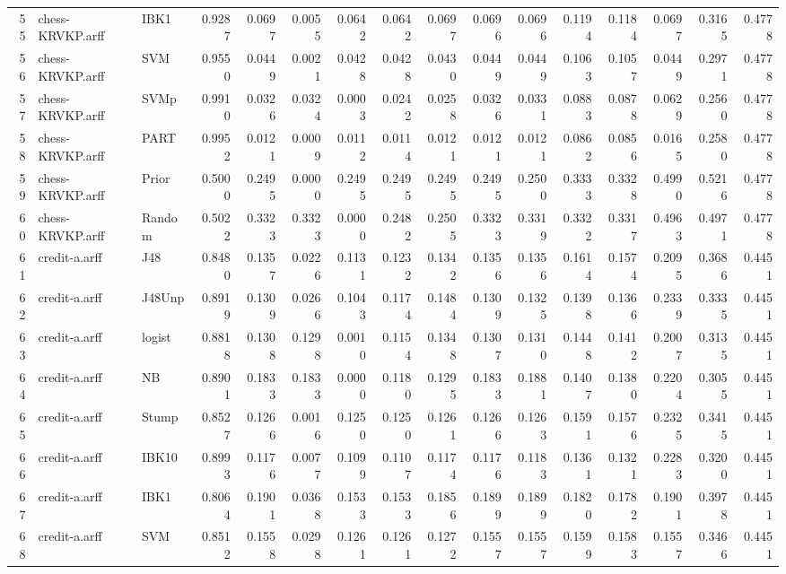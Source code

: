 \documentclass {article}
\begin{document}
\begin{table}[ht]
\begin{tabular}{rllrrrrrrrrrrrrr}
  55 & chess-KRVKP.arff & IBK1 & 0.9287 & 0.0697 & 0.0055 & 0.0642 & 0.0642 & 0.0697 & 0.0696 & 0.0696 & 0.1194 & 0.1184 & 0.0697 & 0.3165 & 0.4778 \\ 
  56 & chess-KRVKP.arff & SVM & 0.9550 & 0.0449 & 0.0021 & 0.0428 & 0.0428 & 0.0430 & 0.0449 & 0.0449 & 0.1063 & 0.1057 & 0.0449 & 0.2971 & 0.4778 \\ 
  57 & chess-KRVKP.arff & SVMp & 0.9910 & 0.0326 & 0.0324 & 0.0003 & 0.0242 & 0.0258 & 0.0326 & 0.0331 & 0.0883 & 0.0878 & 0.0629 & 0.2560 & 0.4778 \\ 
  58 & chess-KRVKP.arff & PART & 0.9952 & 0.0121 & 0.0009 & 0.0112 & 0.0114 & 0.0121 & 0.0121 & 0.0121 & 0.0862 & 0.0856 & 0.0165 & 0.2580 & 0.4778 \\ 
  59 & chess-KRVKP.arff & Prior & 0.5000 & 0.2495 & 0.0000 & 0.2495 & 0.2495 & 0.2495 & 0.2495 & 0.2500 & 0.3333 & 0.3328 & 0.4990 & 0.5216 & 0.4778 \\ 
  60 & chess-KRVKP.arff & Random & 0.5022 & 0.3323 & 0.3323 & 0.0000 & 0.2482 & 0.2505 & 0.3323 & 0.3319 & 0.3322 & 0.3317 & 0.4963 & 0.4971 & 0.4778 \\ 
  61 & credit-a.arff & J48 & 0.8480 & 0.1357 & 0.0226 & 0.1131 & 0.1232 & 0.1342 & 0.1356 & 0.1356 & 0.1614 & 0.1574 & 0.2095 & 0.3686 & 0.4451 \\ 
  62 & credit-a.arff & J48Unp & 0.8919 & 0.1309 & 0.0266 & 0.1043 & 0.1174 & 0.1484 & 0.1309 & 0.1325 & 0.1398 & 0.1366 & 0.2339 & 0.3335 & 0.4451 \\ 
  63 & credit-a.arff & logist & 0.8818 & 0.1308 & 0.1298 & 0.0010 & 0.1154 & 0.1348 & 0.1307 & 0.1310 & 0.1448 & 0.1412 & 0.2007 & 0.3135 & 0.4451 \\ 
  64 & credit-a.arff & NB & 0.8901 & 0.1833 & 0.1833 & 0.0000 & 0.1180 & 0.1295 & 0.1833 & 0.1881 & 0.1407 & 0.1380 & 0.2204 & 0.3055 & 0.4451 \\ 
  65 & credit-a.arff & Stump & 0.8527 & 0.1266 & 0.0016 & 0.1250 & 0.1250 & 0.1261 & 0.1266 & 0.1263 & 0.1591 & 0.1576 & 0.2325 & 0.3415 & 0.4451 \\ 
  66 & credit-a.arff & IBK10 & 0.8993 & 0.1176 & 0.0077 & 0.1099 & 0.1107 & 0.1174 & 0.1176 & 0.1183 & 0.1361 & 0.1321 & 0.2283 & 0.3200 & 0.4451 \\ 
  67 & credit-a.arff & IBK1 & 0.8064 & 0.1901 & 0.0368 & 0.1533 & 0.1533 & 0.1856 & 0.1899 & 0.1899 & 0.1820 & 0.1782 & 0.1901 & 0.3978 & 0.4451 \\ 
  68 & credit-a.arff & SVM & 0.8512 & 0.1558 & 0.0298 & 0.1261 & 0.1261 & 0.1272 & 0.1557 & 0.1557 & 0.1599 & 0.1583 & 0.1557 & 0.3466 & 0.4451 \\ 

\end{tabular}
\end{table}
\end{document}
